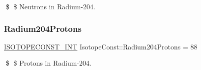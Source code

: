 \$ \$ Neutrons in Radium-\/204. \mbox{\label{group___isotope_const-_radium-_ra204_ga40ac474ba16cf9947ffc1a55156bfbdb}} 
\subsubsection{\texorpdfstring{Radium204\+Protons}{Radium204Protons}}
{\footnotesize\ttfamily \mbox{\hyperlink{group___isotope_const-_macros_ga5f18360b3e99483a35c32d789e62621c}{I\+S\+O\+T\+O\+P\+E\+C\+O\+N\+S\+T\+\_\+\+I\+NT}} Isotope\+Const\+::\+Radium204\+Protons = 88}

\$ \$ Protons in Radium-\/204. 